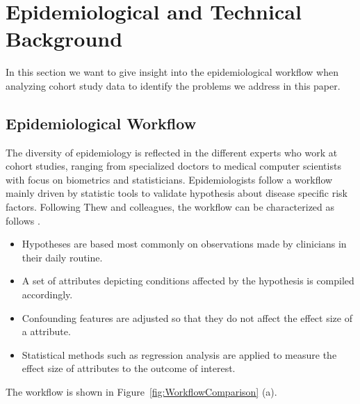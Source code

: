 \documentclass[journal]{style/vgtc} 			          %
\begin{document}


\section{Epidemiological and Technical Background} \label{MedicalAndTechnicalBackground}

In this section we want to give insight into the epidemiological workflow when analyzing cohort study data to identify the problems we address in this paper.
%
%
\subsection{Epidemiological Workflow} \label{EpidemiologicalWorkflow}
The diversity of epidemiology is reflected in the different experts who work at cohort studies, ranging from specialized doctors to medical computer scientists with focus on biometrics and statisticians.
%
Epidemiologists follow a workflow mainly driven by statistic tools to validate hypothesis about disease specific risk factors.
%
Following Thew and colleagues, the workflow can be characterized as follows \cite{Thew2009}.
%
\begin{itemize}
	\item Hypotheses are based most commonly on observations made by clinicians in their daily routine.
%
	\item A set of attributes depicting conditions affected by the hypothesis is compiled accordingly.
	\item Confounding features are adjusted so that they do not affect the effect size of a attribute.
%
	\item Statistical methods such as regression analysis are applied to measure the effect size of attributes to the outcome of interest.
\end{itemize}
The workflow is shown in Figure~\ref{fig:WorkflowComparison} (a).
\end{document}
